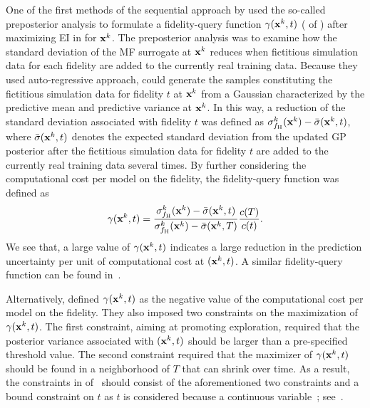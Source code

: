 \documentclass[iicol,sn-basic]{sn-jnl}%
\begin{document}
One of the first methods of the sequential approach by \cite{Chen2016} used the so-called preposterior analysis to formulate a fidelity-query function $\gamma({\bf x}^k,t)$ ( of ) after maximizing EI in  for ${\bf x}^k$.
The preposterior analysis was to examine how the standard deviation of the MF surrogate at ${\bf x}^k$ reduces when fictitious simulation data for each fidelity are added to the currently real training data.
Because they used auto-regressive approach, \cite{Chen2016} could generate the samples constituting the fictitious simulation data for fidelity $t$ at ${\bf x}^k$ from a Gaussian characterized by the predictive mean and predictive variance at ${\bf x}^k$.
In this way, a reduction of the standard deviation associated with fidelity $t$ was defined as $\sigma_{f_\text{H}}^k({\bf x}^k)-\bar{\sigma}({\bf x}^k,t)$, where $\bar{\sigma}({\bf x}^k,t)$ denotes the expected standard deviation from the updated GP posterior after the fictitious simulation data for fidelity $t$ are added to the currently real training data several times.
By further considering the computational cost per model on the fidelity, the fidelity-query function was defined as
\begin{equation}\label{Eq60}
    \gamma({\bf x}^k,t) = \frac{\sigma_{f_\text{H}}^k({\bf x}^k)-\bar{\sigma}({\bf x}^k,t)}{\sigma_{f_\text{H}}^k({\bf x}^k)-\bar{\sigma}({\bf x}^k,T)} \frac{c(T)}{c(t)}.
\end{equation}
We see that, a large value of $\gamma({\bf x}^k,t)$ indicates a large reduction in the prediction uncertainty per unit of computational cost at $({\bf x}^k,t)$.
A similar fidelity-query function can be found in~\cite{Tran2020jcp,Tran2020cise}.

Alternatively, \cite{Kandasamy2017} defined $\gamma({\bf x}^k,t)$ as the negative value of the computational cost per model on the fidelity.
They also imposed two constraints on the maximization of $\gamma({\bf x}^k,t)$.
The first constraint, aiming at promoting exploration, required that the posterior variance associated with $({\bf x}^k,t)$ should be larger than a pre-specified threshold value.
The second constraint required that the maximizer of $\gamma({\bf x}^k,t)$ should be found in a neighborhood of $T$ that can shrink over time.
As a result, the constraints in  of~ should consist of the aforementioned two constraints and a bound constraint on $t$ as $t$ is considered because a continuous variable~\citep{Kandasamy2017}; see~.
\end{document}
